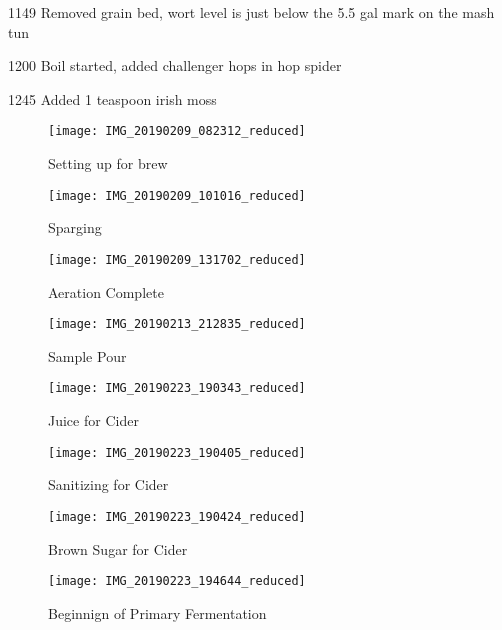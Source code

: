 1149 Removed grain bed, wort level is just below the 5.5 gal mark on the mash tun

1200 Boil started, added challenger hops in hop spider

1245 Added 1 teaspoon irish moss

\begin{figure}[H]
  \centering
  \texttt{[image: IMG\_20190209\_082312\_reduced]}
  \caption{Setting up for brew}\label{fig:brew:setup}
\end{figure}

\begin{figure}[H]
  \centering
  \texttt{[image: IMG\_20190209\_101016\_reduced]}
  \caption{Sparging}\label{fig:brew:sparge}
\end{figure}

\begin{figure}[H]
  \centering
  \texttt{[image: IMG\_20190209\_131702\_reduced]}
  \caption{Aeration Complete}\label{fig:brew:aeration}
\end{figure}

\begin{figure}[H]
  \centering
  \texttt{[image: IMG\_20190213\_212835\_reduced]}
  \caption{Sample Pour}\label{fig:sample:pour}
\end{figure}

\begin{figure}[H]
  \centering
  \texttt{[image: IMG\_20190223\_190343\_reduced]}
  \caption{Juice for Cider}\label{fig:brew:juice}
\end{figure}

\begin{figure}[H]
  \centering
  \texttt{[image: IMG\_20190223\_190405\_reduced]}
  \caption{Sanitizing for Cider}\label{fig:brew:sanitizing}
\end{figure}

\begin{figure}[H]
  \centering
  \texttt{[image: IMG\_20190223\_190424\_reduced]}
  \caption{Brown Sugar for Cider}\label{fig:brew:brownsugar}
\end{figure}

\begin{figure}[H]
  \centering
  \texttt{[image: IMG\_20190223\_194644\_reduced]}
  \caption{Beginnign of Primary Fermentation}\label{fig:brew:primary}
\end{figure}

